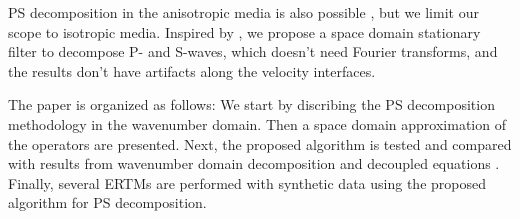 \documentclass[manuscript,ulem,graphix,revised]{geophysics}
\begin{document}

PS decomposition in the anisotropic media is also possible \citep{zhang10, cheng14, wenlong18}, but we limit our scope to isotropic media. Inspired by \citet{yan09}, we propose a space domain stationary filter to decompose P- and S-waves, which doesn't need Fourier transforms, and the results don't have artifacts along the velocity interfaces.

The paper is organized as follows: We start by discribing the PS decomposition methodology in the wavenumber domain. Then a space domain approximation of the operators are presented. Next, the proposed algorithm is tested and compared with results from wavenumber domain decomposition \citep{zhang10} and decoupled equations \citep{ma03, wenlong_cmp15}. Finally, several ERTMs are performed with synthetic data using the proposed algorithm for PS decomposition.



\end{document}
